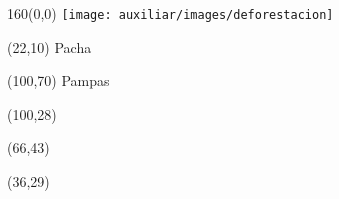 \documentclass[shownotes,aspectratio=169]{beamer}
\begin{document}
\begin{frame}[plain]

\begin{textblock}{160}(0,0)
\texttt{[image: auxiliar/images/deforestacion]}
\end{textblock}

\begin{textblock}{80}(22,10)
\textcolor{black!15}{\fontsize{44}{55}\selectfont Pacha}
\end{textblock}

\begin{textblock}{47}(100,70)
\centering \textcolor{black!15}{{\fontsize{52}{65}\selectfont Pampas}}
\end{textblock}

\begin{textblock}{80}(100,28)
\LARGE  \textcolor{black!15}{}
\end{textblock}


\begin{textblock}{80}(66,43)
\LARGE  \textcolor{black!15}{\scalebox{6}{$=$}}
\end{textblock}

\begin{textblock}{80}(36,29)
\LARGE  \textcolor{black!15}{\scalebox{9}{$p$}}
\end{textblock}

% 

% 

\end{frame}

% 
\end{document}
